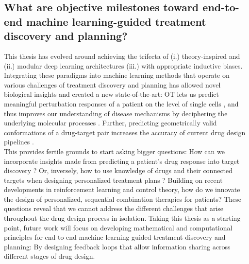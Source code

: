 \subsection*{\textbf{What are objective milestones toward end-to-end machine learning-guided treatment discovery and planning?}}

This thesis has evolved around achieving the trifecta of (i.) theory-inspired and (ii.) modular deep learning architectures (iii.) with appropriate inductive biases. Integrating these paradigms into machine learning methods that operate on various challenges of treatment discovery and planning has allowed novel biological insights and created a new state-of-the-art: OT lets us predict meaningful perturbation responses of a patient on the level of single cells \citep{bunne2021learning, bunne2022supervised}, and thus improves our understanding of disease mechanisms by deciphering the underlying molecular processes \citep{bunne2022proximal, bunne2022recovering}. Further, predicting geometrically valid conformations of a drug-target pair increases the accuracy of current drug design pipelines \citep{somnath2021multi, ganea2022independent, somnath2023aligned}. \\

This provides fertile grounds to start asking bigger questions: How can we incorporate insights made from predicting a patient's drug response into target discovery \citep{huang2022artificial}? Or, inversely, how to use knowledge of drugs and their connected targets when designing personalized treatment plans \citep{nilforoshan2023zero}? Building on recent developments in reinforcement learning and control theory, how do we innovate the design of personalized, sequential combination therapies for patients?
These questions reveal that we cannot address the different challenges that arise throughout the drug design process in isolation.
Taking this thesis as a starting point, future work will focus on developing mathematical and computational principles for end-to-end machine learning-guided treatment discovery and planning:
By designing feedback loops that allow information sharing across different stages of drug design.


